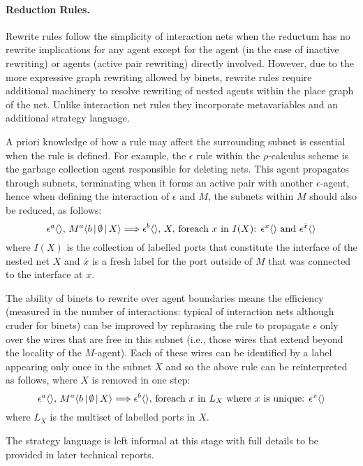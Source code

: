 \documentclass[copyright,creativecommons]{eptcs}
\begin{document}
\paragraph{Reduction Rules.}
Rewrite rules follow the simplicity of interaction nets when the
reductum has no rewrite implications for any agent except for the
agent (in the case of inactive rewriting) or agents (active pair
  rewriting) directly involved.  However, due to the more expressive
graph rewriting allowed by binets, rewrite rules require additional
machinery to resolve rewriting of nested agents within the place graph
of the net. Unlike interaction net rules they incorporate
metavariables and an additional strategy language.

A priori knowledge of how a rule may affect the surrounding subnet is essential when the rule is defined.  For example, the $\epsilon$ rule within the $\rho$-calculus scheme is the garbage collection agent responsible for deleting nets.  This agent propagates through subnets, terminating when it forms an active pair with another $\epsilon$-agent, hence when defining the interaction of $\epsilon$ and $M$, the subnets within $M$ should also be reduced, as follows:
$$
\epsilon^{a} \langle \rangle, \, M^{a} \langle b \,|\, \emptyset \,|\, X \rangle \Longrightarrow
\epsilon^{b} \langle \rangle,\,X,\,
\mbox{foreach }x\mbox{ in }I(X)\mbox{: }\epsilon^{x} \langle \rangle\mbox{ and }\epsilon^{\bar{x}} \langle \rangle
$$ 
where $I(X)$ is the collection of labelled ports that constitute
the interface of the nested net $X$ and $\bar{x}$ is a fresh label for
the port outside of $M$ that was connected to the interface at $x$.

The ability of binets to rewrite over agent boundaries means the
efficiency (measured in the number of interactions: typical of
interaction nets although cruder for binets) can be improved by
rephrasing the rule to propagate $\epsilon$ only over the wires that
are free in this subnet (i.e., those wires that extend beyond the
locality of the $M$-agent).  Each of these wires can be identified by a
label appearing only once in the subnet $X$ and so the above rule can
be reinterpreted as follows, where $X$ is removed in one step:
$$
\epsilon^{a} \langle \rangle, \, M^{a} \langle b \,|\, \emptyset \,|\, X \rangle \Longrightarrow
\epsilon^{b} \langle \rangle,\,
\mbox{foreach }x\mbox{ in }L_X\mbox{ where }x\mbox{ is unique:
}\epsilon^{x} \langle \rangle 
$$
where $L_X$ is the multiset of labelled ports in $X$.

The strategy language is left informal at this stage with full details
to be provided in later technical reports.
\end{document}

